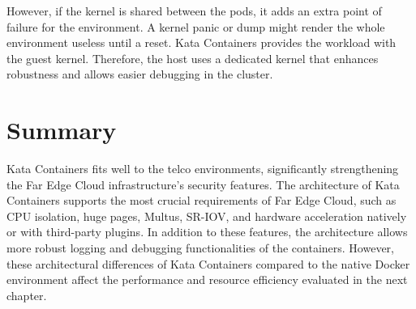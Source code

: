 However, if the kernel is shared between the pods, it adds an extra point of failure for the environment. A kernel panic or dump might render the whole environment useless until a reset. Kata Containers provides the workload with the guest kernel. Therefore, the host uses a dedicated kernel that enhances robustness and allows easier debugging in the cluster.

\section{Summary}

Kata Containers fits well to the telco environments, significantly strengthening the Far Edge Cloud infrastructure's security features. The architecture of Kata Containers supports the most crucial requirements of Far Edge Cloud, such as CPU isolation, huge pages, Multus, SR-IOV, and hardware acceleration natively or with third-party plugins. In addition to these features, the architecture allows more robust logging and debugging functionalities of the containers. However, these architectural differences of Kata Containers compared to the native Docker environment affect the performance and resource efficiency evaluated in the next chapter.